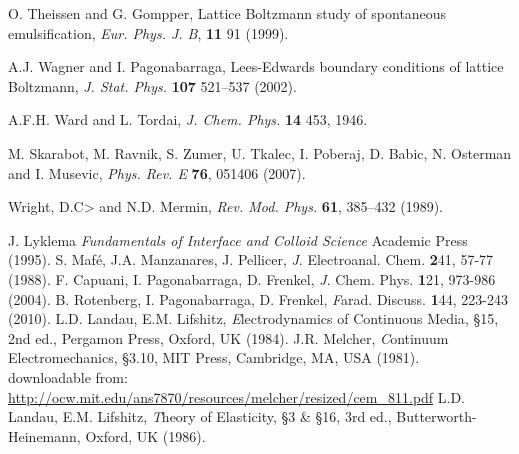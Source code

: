 \begin{thebibliography}{99}
O. Theissen and G. Gompper,
Lattice Boltzmann study of spontaneous emulsification,
\textit{Eur. Phys. J. B}, \textbf{11} 91 (1999).

A.J. Wagner and I. Pagonabarraga,
Lees-Edwards boundary conditions of lattice Boltzmann,
\textit{J. Stat. Phys.} \textbf{107} 521--537 (2002).

A.F.H. Ward and L. Tordai,
\textit{J. Chem. Phys.} \textbf{14} 453, 1946.

M. Skarabot, M. Ravnik, S. Zumer, U. Tkalec, I. Poberaj, D. Babic, N. Osterman and I. Musevic,
\textit{Phys. Rev. E} \textbf{76}, 051406 (2007).

Wright, D.C> and N.D. Mermin,
\textit{Rev. Mod. Phys.} \textbf{61}, 385--432 (1989).

 J. Lyklema {\em Fundamentals of Interface and Colloid Science} Academic Press (1995).
 S. Maf\'e, J.A. Manzanares, J. Pellicer, {\textit J. Electroanal. Chem.} {\textbf 241}, 57-77 (1988).
 F. Capuani, I. Pagonabarraga, D. Frenkel, {\textit J. Chem. Phys.} {\textbf 121}, 973-986 (2004).
 B. Rotenberg, I. Pagonabarraga, D. Frenkel, {\textit Farad. Discuss.} {\textbf 144}, 223-243 (2010).
 L.D. Landau, E.M. Lifshitz, {\textit Electrodynamics of Continuous Media}, \S 15, 2nd ed., Pergamon Press, Oxford, UK (1984).
 J.R. Melcher, {\textit Continuum Electromechanics}, \S 3.10, MIT Press, Cambridge, MA, USA (1981).\\
downloadable from:\\
\url{http://ocw.mit.edu/ans7870/resources/melcher/resized/cem_811.pdf}
 L.D. Landau, E.M. Lifshitz, {\textit Theory of Elasticity}, \S 3 \& \S 16, 3rd ed., Butterworth-Heinemann, Oxford, UK (1986).



\end{thebibliography}


